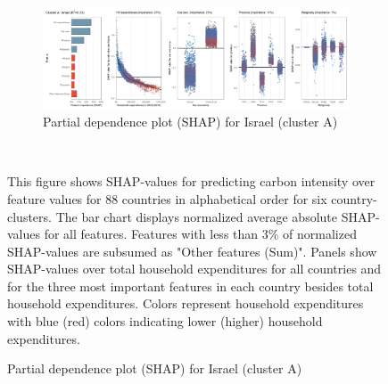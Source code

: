 \begin{figure}[ht!]
    \vspace{0.5cm}
   \begin{subfigure}[b]{\textwidth}
   \centering
         \caption{Partial dependence plot (SHAP) for Israel (cluster A)}
         \label{fig:5b_ISR}
         \includegraphics[width=\textwidth]{Figure 5b/Figure_5b_ISR}
         \end{subfigure}
    \\
    \vspace{0.5cm}
   
    \begin{subcaption2}
     This figure shows SHAP-values for predicting carbon intensity over feature values for 88 countries in alphabetical order for six country-clusters. The bar chart displays normalized average absolute SHAP-values for all features. Features with less than 3\% of normalized SHAP-values are subsumed as "Other features (Sum)". Panels show SHAP-values over total household expenditures for all countries and for the three most important features in each country besides total household expenditures. Colors represent household expenditures with blue (red) colors indicating lower (higher) household expenditures.
     \end{subcaption2}
\end{figure}

